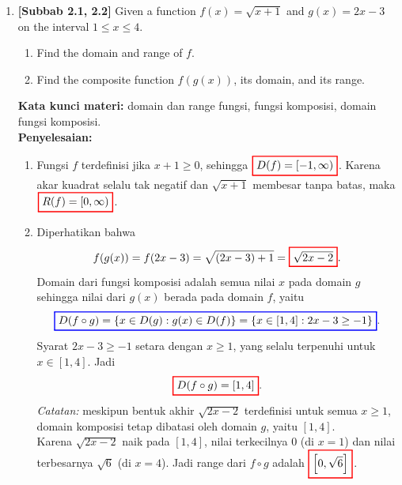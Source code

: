 \documentclass[10pt,openany,a4paper]{article}
\theoremstyle{definition}
\theoremstyle{definition}
\theoremstyle{plain}
\newenvironment{jawab}[2][tes]{%
\par\noindent\textbf{Kata kunci materi:} #1.\\
\textbf{Penyelesaian:} #2%
}{}
\begin{document}
\begin{enumerate}
    \item \textbf{[Subbab 2.1, 2.2]} Given a function $f(x)=\sqrt{x+1}$ and $g(x)=2x-3$ on the interval $1\leq x\leq 4$.
    \begin{enumerate}
        \item Find the domain and range of $f$.
        \item Find the composite function $f(g(x))$, its domain, and its range.
    \end{enumerate}
    \begin{jawab}[domain dan range fungsi, fungsi komposisi, domain fungsi komposisi]{
        \begin{enumerate}
            \item Fungsi $f$ terdefinisi jika $x+1\geq 0$, sehingga $\colorlet{oldcolor}{.}
        \color{red}
        \setlength{\fboxrule}{1pt} \boxed{\color{oldcolor}D(f)=[-1,\infty)}\color{oldcolor}$. Karena akar kuadrat selalu tak negatif dan $\sqrt{x+1}$ membesar tanpa batas, maka $\colorlet{oldcolor}{.}
        \color{red}
        \setlength{\fboxrule}{1pt} \boxed{\color{oldcolor}R(f)=[0,\infty)}\color{oldcolor}$.
            \item Diperhatikan bahwa
            \begin{align*}
                f(g(x)) = f(2x-3) = \sqrt{(2x-3)+1} = \colorlet{oldcolor}{.}
        \color{red}
        \setlength{\fboxrule}{1pt} \boxed{\color{oldcolor}\sqrt{2x-2}}\color{oldcolor}.
            \end{align*}
            Domain dari fungsi komposisi adalah semua nilai $x$ pada domain $g$ sehingga nilai dari $g(x)$ berada pada domain $f$, yaitu
            \begin{align*}
                \colorlet{oldcolor}{.}
        \color{blue}
        \setlength{\fboxrule}{1pt} \boxed{\color{oldcolor}D(f\circ g) = \{x \in D(g) : g(x) \in D(f)\} = \{x \in [1,4] : 2x-3\geq -1\}}\color{oldcolor}.
            \end{align*}
            Syarat $2x-3\geq -1$ setara dengan $x\geq 1$, yang selalu terpenuhi untuk $x\in[1,4]$. Jadi
            \begin{align*}
                \colorlet{oldcolor}{.}
        \color{red}
        \setlength{\fboxrule}{1pt} \boxed{\color{oldcolor}D(f\circ g)=[1,4]}\color{oldcolor}.
            \end{align*}
            \textit{Catatan:} meskipun bentuk akhir $\sqrt{2x-2}$ terdefinisi untuk semua $x\geq 1$, domain komposisi tetap dibatasi oleh domain $g$, yaitu $[1,4]$.\\
            Karena $\sqrt{2x-2}$ naik pada $[1,4]$, nilai terkecilnya $0$ (di $x=1$) dan nilai terbesarnya $\sqrt{6}$ (di $x=4$). Jadi range dari $f\circ g$ adalah $\colorlet{oldcolor}{.}
        \color{red}
        \setlength{\fboxrule}{1pt} \boxed{\color{oldcolor}\left[0,\sqrt{6}\right]}\color{oldcolor}$.
        \end{enumerate}
    }
    \end{jawab}


\end{enumerate}
\end{document}
